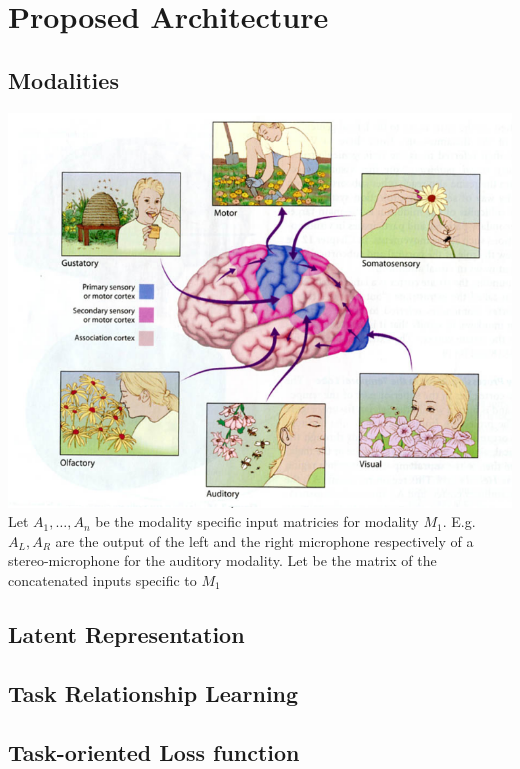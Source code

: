 \section{Proposed Architecture}

\subsection{Modalities}
\includegraphics[width=\textwidth]{img/modalities.png}
Let $A_1, \dots, A_n$ be the modality specific input matricies for modality $M_1$. E.g. $A_L, A_R$ are the output of the left and the right microphone respectively of a stereo-microphone for the auditory modality. Let  be the matrix of the concatenated inputs specific to $M_1$
\subsection{Latent Representation}

\subsection{Task Relationship Learning}

\subsection{Task-oriented Loss function}

